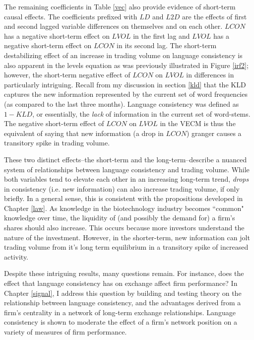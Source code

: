 The remaining coefficients in Table \ref{vec} also provide evidence of short-term causal effects. The coefficients prefixed with $LD$ and $L2D$ are the effects of first and second lagged variable differences on themselves and on each other. $LCON$ has a negative short-term effect on $LVOL$ in the first lag and $LVOL$ has a negative short-term effect on $LCON$ in its second lag. The short-term destabilizing effect of an increase in trading volume on language consistency is also apparent in the levels equation as was previously illustrated in Figure \ref{irf2}; however, the short-term negative effect of $LCON$ on $LVOL$ in differences in particularly intriguing. Recall from my discussion in section \ref{kld} that the KLD captures the new information represented by the current set of word frequencies (as compared to the last three months). Language consistency was defined as $1-KLD$, or essentially, the \emph{lack} of information in the current set of word-stems. The negative short-term effect of $LCON$ on $LVOL$ in the VECM is thus the equivalent of saying that new information (a drop in $LCON$) granger causes a transitory spike in trading volume.

These two distinct effects--the short-term and the long-term--describe a nuanced system of relationships between language consistency and trading volume. While both variables tend to elevate each other in an increasing long-term trend, \emph{drops} in consistency (i.e. new information) can also increase trading volume, if only briefly. In a general sense, this is consistent with the propositions developed in Chapter \ref{law}. As knowledge in the  biotechnology industry becomes ``common" knowledge over time, the liquidity of (and possibly the demand for) a firm's shares should also increase. This occurs because more investors understand the nature of the investment. However, in the shorter-term, new information can jolt trading volume from it's long term equilibrium in a transitory spike of increased activity.

Despite these intriguing results, many questions remain. For instance, does the effect that language consistency has on exchange affect firm performance? In Chapter \ref{signal}, I address this question by building and testing theory on the relationship between language consistency, and the advantages derived from a firm's centrality in a network of long-term exchange relationships. Language consistency is shown to moderate the effect of a firm's network position on a variety of measures of firm performance.


